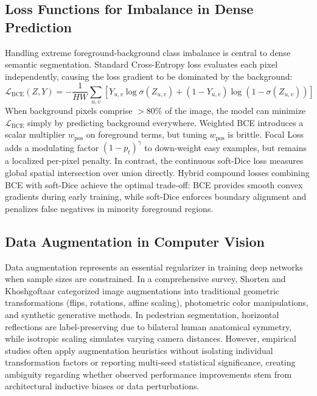 \documentclass[10pt,a4paper]{article}
\begin{document}
\subsection{Loss Functions for Imbalance in Dense Prediction}
Handling extreme foreground-background class imbalance is central to dense semantic segmentation. Standard Cross-Entropy loss evaluates each pixel independently, causing the loss gradient to be dominated by the background:
\begin{equation}
    \mathcal{L}_{\text{BCE}}(Z, Y) = -\frac{1}{HW} \sum_{u,v} \left[ Y_{u,v} \log \sigma(Z_{u,v}) + (1 - Y_{u,v}) \log (1 - \sigma(Z_{u,v})) \right]
    \label{eq:bce_formula}
\end{equation}
When background pixels comprise $>80\%$ of the image, the model can minimize $\mathcal{L}_{\text{BCE}}$ simply by predicting background everywhere. Weighted BCE introduces a scalar multiplier $w_{\text{pos}}$ on foreground terms, but tuning $w_{\text{pos}}$ is brittle. Focal Loss \cite{lin2017focal} adds a modulating factor $(1 - p_t)^\gamma$ to down-weight easy examples, but remains a localized per-pixel penalty. In contrast, the continuous soft-Dice loss \cite{milletari2016vnet} measures global spatial intersection over union directly. Hybrid compound losses combining BCE with soft-Dice achieve the optimal trade-off: BCE provides smooth convex gradients during early training, while soft-Dice enforces boundary alignment and penalizes false negatives in minority foreground regions.

\subsection{Data Augmentation in Computer Vision}
Data augmentation represents an essential regularizer in training deep networks when sample sizes are constrained. In a comprehensive survey, Shorten and Khoshgoftaar \cite{shorten2019survey} categorized image augmentations into traditional geometric transformations (flips, rotations, affine scaling), photometric color manipulations, and synthetic generative methods. In pedestrian segmentation, horizontal reflections are label-preserving due to bilateral human anatomical symmetry, while isotropic scaling simulates varying camera distances. However, empirical studies often apply augmentation heuristics without isolating individual transformation factors or reporting multi-seed statistical significance, creating ambiguity regarding whether observed performance improvements stem from architectural inductive biases or data perturbations.
\end{document}
